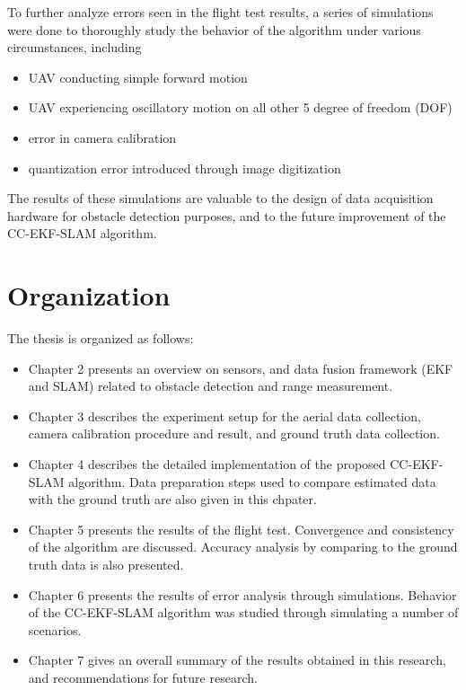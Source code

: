 To further analyze errors seen in the flight test results, a series
of simulations were done to thoroughly study the behavior of the
algorithm under various circumstances, including
\begin{itemize}
\item UAV conducting simple forward motion
\item UAV experiencing oscillatory motion on all other 5 degree of
freedom (DOF)
\item error in camera calibration
\item quantization error introduced through image digitization 
\end{itemize}
The results of these simulations are valuable to the design of data
acquisition hardware for obstacle detection purposes, and to the future
improvement of the CC-EKF-SLAM algorithm.

\section{Organization}\label{section:Organization}
The thesis is organized as follows:

\begin{itemize}
  \item Chapter 2 presents an overview on sensors, and data fusion
  framework (EKF and SLAM) related to obstacle detection and range
  measurement.
  \item Chapter 3 describes the experiment setup for the aerial data
  collection, camera calibration procedure and result, and ground
  truth data collection.
  \item Chapter 4 describes the detailed implementation of the proposed
  CC-EKF-SLAM algorithm. Data preparation steps used to compare
  estimated data with the ground truth are also given in this chpater.
  \item Chapter 5 presents the results of the flight test. Convergence and
  consistency of the algorithm are discussed. Accuracy analysis by
  comparing to the ground truth data is also presented.
  \item Chapter 6 presents the results of error analysis through
  simulations. Behavior of the CC-EKF-SLAM
  algorithm was studied through simulating a number of scenarios.
  \item Chapter 7 gives an overall summary of the results obtained in
  this research, and recommendations for future research.
\end{itemize}

